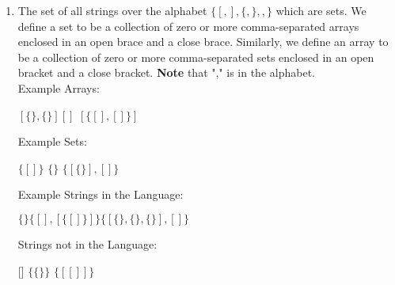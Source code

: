\documentclass[11pt]{article}
\newcommand\tab[1][1cm]{\hspace*{#1}}
\begin{document}
\begin{enumerate}
\begin{enumerate}
    \newpage
    \item  The set of all strings over the alphabet $\{[,],\{,\},,\}$ which are sets. We define a set to be a collection of zero or more comma-separated arrays enclosed in an open brace and a close brace. Similarly, we define an array to be a collection of zero or more comma-separated sets enclosed in an open bracket and a close bracket. \textbf{Note} that "," is in the alphabet.\\
    Example Arrays:
    \begin{center}
    $[\{\},\{\}]$\tab $[]$ \tab $[\{[],[]\}]$   
    \end{center}
    Example Sets:
    \begin{center}
    $\{[]\}$ \tab $\{\}$ \tab $\{[\{\}], []\}$  
    \end{center}
    Example Strings in the Language: 
    \begin{center}
    $\{\}$\tab $\{[],[\{[]\}]\}$\tab $\{[\{\}, \{\}, \{\}],[]\}$   
    \end{center}
    Strings not in the Language: 
    \begin{center}
    []  \tab \tab $\{\{\}\}$ \tab \tab $\{[[]]\}$
    \end{center}
  \end{enumerate}
  

\end{enumerate}
\end{document}
